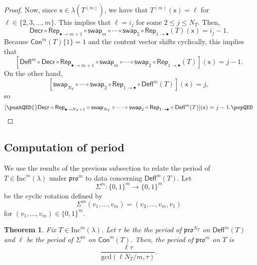 \documentclass[12pt]{amsart}
\newcommand{\x}{\ensuremath{\mathsf{x}}}
\newtheorem{theorem}{Theorem}[section]
\theoremstyle{definition}
\theoremstyle{remark}
\numberwithin{equation}{section}
\newcommand{\inc}{\ensuremath{\mathrm{Inc}}}
\newcommand{\pro}{\mathfrak{pro}}
\newcommand{\swap}{\ensuremath{\mathsf{swap}}}
\newcommand{\decr}{\ensuremath{\mathsf{Decr}}}
\newcommand{\rep}{\ensuremath{\mathsf{Rep}}}
\newcommand{\deflate}{\ensuremath{\mathsf{Defl}}}
\newcommand{\content}{\ensuremath{\mathsf{Con}}}
\begin{document}
\begin{proof}
Now, since $\x \in \lambda(T^{(m)})$, we have that $T^{(m)}(\x) = \ell$ for $\ell \in \{2,3,\dots,m\}$. This implies that $\ell = i_j$ for some $2 \leq j \leq N_T$. Then, 
\[
\decr \circ \rep_{\bullet \to m+1} \circ \swap_m \circ \cdots \circ \swap_2 \circ \rep_{1 \rightarrow \bullet} (T)(\x) = i_j-1.
\]
Because $\content^m(T) \lbrace 1 \rbrace = 1$ and the content vector shifts cyclically, this implies that 
 \[
 [\deflate^m \circ \decr \circ \rep_{\bullet \rightarrow m+1} \circ \swap_m \circ \cdots \circ \swap_2 \circ \rep_{1 \rightarrow \bullet} (T)](\x) = j-1.
 \]
  On the other hand, 
  \[
  [\swap_{N_T} \circ \cdots \circ \swap_2 \circ \rep_{1 \rightarrow \bullet} \circ \deflate^m(T)](\x) = j,
  \]
   so 
   \[
   [ \pushQED{\qed} \decr \circ \rep_{\bullet \rightarrow N_T + 1} \circ \swap_{N_T} \circ \cdots \circ \swap_2 \circ \rep_{1 \rightarrow \bullet} \circ  \deflate^m(T)](\x) = j-1. \qedhere \popQED \] \let\qed\relax
\end{proof}

\subsection{Computation of period}\label{sec:period} We use the results of the previous subsection to relate the period of $T \in \inc^m(\lambda)$ under $\pro^m$ to data concerning $\deflate^m(T)$. Let 
\[\Sigma^m : \lbrace 0,1\rbrace^m \rightarrow \lbrace 0,1\rbrace^m\]
 be the cyclic rotation defined by 
 \[
 \Sigma^m(v_1, \dots, v_m) = (v_2, \dots, v_m, v_1)
 \]
  for $(v_1, \dots, v_m) \in \lbrace 0,1 \rbrace^m$. 
  
\begin{theorem}\label{thm:periodthm}
Fix $T \in \inc^m(\lambda)$. Let $\tau$ be the the period of $\pro^{N_T}$ on $\deflate^m(T)$ and $\ell$ be the period of $\Sigma^m$ on $\content^m(T)$. Then, the period of $\pro^m$ on $T$ is \[\frac{\ell  \tau}{\mathrm{gcd}(\ell N_T / m,\tau)}. \]
\end{theorem} 
    
\end{document}
